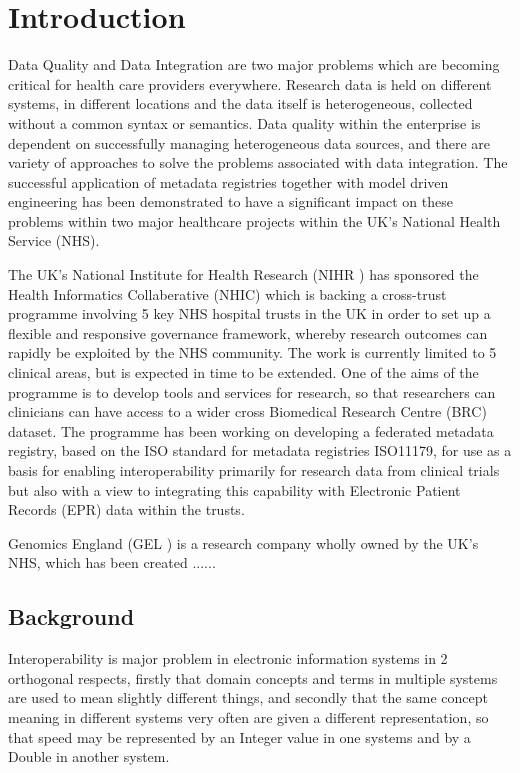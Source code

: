 
\section{Introduction}

Data Quality and Data Integration are two major problems which are becoming critical for health care providers everywhere. Research data is held on different systems, in different locations and the data itself is heterogeneous, collected without a common syntax or semantics. Data quality within the enterprise is dependent on successfully managing heterogeneous data sources, and there are variety of approaches to solve the problems associated with data integration.   The successful application of metadata registries together with model driven engineering has been demonstrated to have a significant impact on these problems within two major healthcare projects within the UK's National Health Service (NHS).

The UK's National Institute for Health Research (NIHR \cite{NIHR}) has sponsored the Health Informatics Collaberative (NHIC) which is backing a cross-trust programme involving 5 key NHS hospital trusts in the UK in order to set up a flexible and responsive governance framework, whereby research outcomes can rapidly be exploited by the NHS community. The work is currently limited to 5 clinical areas, but is expected in time to be extended. One of the aims of the programme is to develop tools and services for research, so that researchers can clinicians can have access to a wider cross Biomedical Research Centre (BRC) dataset. The programme has been working on developing a federated metadata registry, based on the ISO standard for metadata registries ISO11179\cite{ISO11179}, for use as a basis for enabling interoperability primarily for research data from clinical trials but also with a view to integrating this capability with Electronic Patient Records (EPR) data within the trusts.

Genomics England (GEL \cite{GEL}) is a research company wholly owned by the UK's NHS, which has been created ......

\subsection{Background}

Interoperability is major problem in electronic information systems in 2 orthogonal respects, firstly that domain concepts and terms in multiple systems are used to mean slightly different things, and secondly that the same concept meaning in different systems very often are given a different representation, so that speed may be represented by an Integer value in one systems and by a Double in another system.

